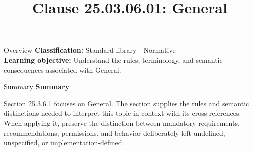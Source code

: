 \documentclass[10pt,letterpaper]{article}
\title{Clause 25.03.06.01: General}
\author{}
\date{}
\begin{document}
\maketitle
\begin{CornellOverviewBox}{Overview}
\textbf{Classification:} Standard library - Normative\\[2pt]
\textbf{Learning objective:} Understand the rules, terminology, and semantic consequences associated with General.
\end{CornellOverviewBox}\begin{CornellSummaryBox}{Summary}
{\sffamily\bfseries\color{Accent} Summary}\par\vspace{3pt}Section 25.3.6.1 focuses on General. The section supplies the rules and semantic distinctions needed to interpret this topic in context with its cross-references. When applying it, preserve the distinction between mandatory requirements, recommendations, permissions, and behavior deliberately left undefined, unspecified, or implementation-defined.
\end{CornellSummaryBox}
\end{document}
